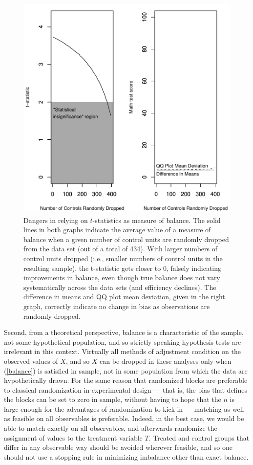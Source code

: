 \documentclass[11pt,titlepage]{article}
\begin{document}
\begin{figure}[t]
  \centering
  \includegraphics[height=4.5in]{figs/TStatPlotR0MATH}
  \caption{Dangers in relying on $t$-statistics as measure of balance.
    The solid lines in both graphs indicate the average value of a
    measure of balance when a given number of control units are
    randomly dropped from the data set (out of a total of 434).  With
    larger numbers of control units dropped (i.e., smaller numbers of
    control units in the resulting sample), the t-statistic gets
    closer to 0, falsely indicating improvements in balance, even
    though true balance does not vary systematically across the data
    sets (and efficiency declines).  The difference in means and QQ
    plot mean deviation, given in the right graph, correctly indicate
    no change in bias as observations are randomly dropped.}
  \label{f:randrop}
\end{figure}

Second, from a theoretical perspective, balance is a characteristic of
the sample, not some hypothetical population, and so strictly speaking
hypothesis tests are irrelevant in this context.  Virtually all
methods of adjustment condition on the observed values of $X$, and so
$X$ can be dropped in these analyses only when (\ref{balance}) is
satisfied in sample, not in some population from which the data are
hypothetically drawn.  For the same reason that randomized blocks are
preferable to classical randomization in experimental design --- that
is, the bias that defines the blocks can be set to zero in sample,
without having to hope that the $n$ is large enough for the advantages
of randomization to kick in --- matching as well as feasible on all
observables is preferable.  Indeed, in the best case, we would be able
to match exactly on all observables, and afterwards randomize the
assignment of values to the treatment variable $T$.  Treated and
control groups that differ in any observable way should be avoided
wherever feasible, and so one should not use a stopping rule in
minimizing imbalance other than exact balance.
\end{document}
